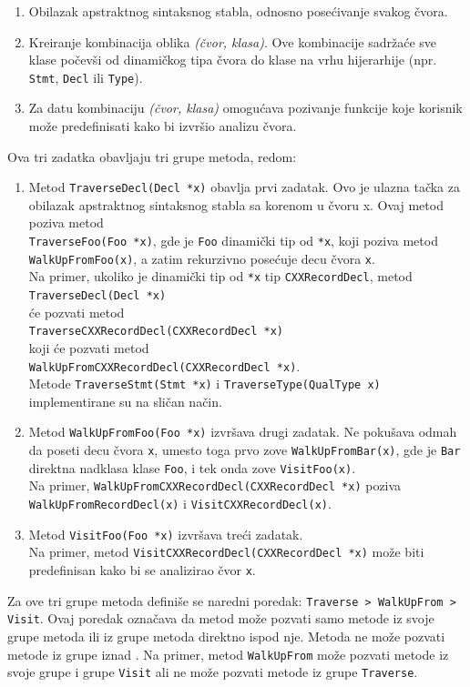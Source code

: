 \documentclass[12pt,oneside]{memoir}
\begin{document}
\begin{enumerate}
\item Obilazak apstraktnog sintaksnog stabla, odnosno pose\'{c}ivanje svakog \v{c}vora.
\item Kreiranje kombinacija oblika \textit{(\v{c}vor, klasa)}. Ove kombinacije sadr\v{z}a\'{c}e sve klase počevši od dinamičkog tipa čvora do klase na vrhu hijerarhije (npr. \texttt{Stmt}, \texttt{Decl} ili \texttt{Type}).
\item Za datu kombinaciju \textit{(čvor, klasa)} omogu\'{c}ava pozivanje funkcije koje korisnik može predefinisati kako bi izvr\v{s}io analizu čvora.
\end{enumerate}
Ova tri zadatka obavljaju tri grupe metoda, redom:
\begin{enumerate}
  \item Metod \texttt{TraverseDecl(Decl *x)} obavlja prvi zadatak. Ovo je ulazna tačka za obilazak apstraktnog sintaksnog stabla sa korenom u čvoru x. Ovaj metod poziva metod \\ \texttt{TraverseFoo(Foo *x)}, gde je \texttt{Foo} dinamički tip od \texttt{*x}, koji poziva metod \\ \texttt{WalkUpFromFoo(x)}, a zatim rekurzivno posećuje decu čvora \texttt{x}. \\
  Na primer, ukoliko je dinami\v{c}ki tip od \texttt{*x} tip \texttt{CXXRecordDecl}, metod \\ \texttt{TraverseDecl(Decl *x)} \\ \'{c}e pozvati metod \\ \texttt{TraverseCXXRecordDecl(CXXRecordDecl *x)} \\ koji \'{c}e pozvati metod \\ \texttt{WalkUpFromCXXRecordDecl(CXXRecordDecl *x)}. \\ Metode \texttt{TraverseStmt(Stmt *x)} i \texttt{TraverseType(QualType x)} implementirane su na sličan način.
 
\item Metod \texttt{WalkUpFromFoo(Foo *x)} izvršava drugi zadatak. Ne pokušava odmah da poseti decu čvora \texttt{x}, umesto toga prvo zove \texttt{WalkUpFromBar(x)}, gde je \texttt{Bar} direktna nadklasa klase \texttt{Foo}, i tek onda zove \texttt{VisitFoo(x)}. \\
Na primer, \texttt{WalkUpFromCXXRecordDecl(CXXRecordDecl *x)} poziva \\ \texttt{WalkUpFromRecordDecl(x)} i \texttt{VisitCXXRecordDecl(x)}.
\item Metod \texttt{VisitFoo(Foo *x)} izvršava tre\'{c}i zadatak. \\Na primer, metod \texttt{VisitCXXRecordDecl(CXXRecordDecl *x)} mo\v{z}e biti predefinisan kako bi se analizirao \v{c}vor \texttt{x}.
\end{enumerate}
Za ove tri grupe metoda defini\v{s}e se naredni poredak: \texttt{Traverse > WalkUpFrom > Visit}. Ovaj poredak ozna\v{c}ava da metod mo\v{z}e pozvati samo metode iz svoje grupe metoda ili iz grupe metoda direktno ispod nje. Metoda ne mo\v{z}e pozvati metode iz grupe iznad \cite{visitors}. Na primer, metod \texttt{WalkUpFrom} mo\v{z}e pozvati metode iz svoje grupe i grupe \texttt{Visit} ali 
ne mo\v{z}e pozvati metode iz grupe \texttt{Traverse}.
\end{document}
